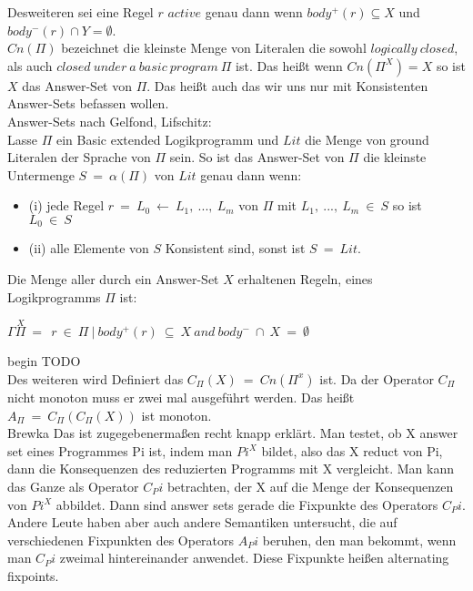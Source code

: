 Desweiteren sei eine Regel $r$ $active$ genau dann wenn $body^+(r) \subseteq X$ und $body^-(r) \cap Y = \emptyset$.\\

$Cn(\Pi)$ bezeichnet die kleinste Menge von Literalen die sowohl $logically~closed$, als auch $closed~under~a~basic~program~\Pi$ ist. Das heißt wenn $Cn(\Pi^X)=X$ so ist $X$ das Answer-Set von $\Pi$. Das heißt auch das wir uns nur mit Konsistenten Answer-Sets befassen wollen.\\

Answer-Sets nach Gelfond, Lifschitz:\\

Lasse $\Pi$ ein Basic extended Logikprogramm und $Lit$ die Menge von ground Literalen der Sprache von $\Pi$ sein. So ist das Answer-Set von $\Pi$ die kleinste Untermenge $S~=~\alpha(\Pi)$ von $Lit$ genau dann wenn:

\begin{itemize}
	\item (i) jede Regel $r~=~L_0~\leftarrow~L_1 ,~...,~L_m$ von $\Pi$ mit $L_1 ,~...,~L_m~\in~S$ so ist $L_0~\in~S$
	\item (ii) alle Elemente von $S$ Konsistent sind, sonst ist $S~=~Lit$.
\end{itemize}

Die Menge aller durch ein Answer-Set $X$ erhaltenen Regeln, eines Logikprogramms $\Pi$ ist:

\begin{center}
  $\Gamma\stackrel{X}{\Pi}~=~{~r~\in~\Pi~|~body^+(r)~\subseteq~X~and~body^-~\cap~X~=~\emptyset~}~$\\
\end{center}


begin TODO \\

Des weiteren wird Definiert das $C_\Pi(X)~=~Cn(\Pi^x)$ ist. Da der Operator $C_\Pi$ nicht monoton muss er zwei mal ausgeführt werden. Das heißt $A_\Pi~=~C_\Pi(C_\Pi(X))$ ist monoton.
\\

Brewka
Das ist zugegebenermaßen recht knapp erklärt. Man testet, ob X answer 
set eines Programmes Pi ist, indem man $Pi^X$ bildet, also das X reduct 
von Pi, dann die Konsequenzen des reduzierten Programms mit X 
vergleicht. Man kann das Ganze als Operator $C_Pi$ betrachten, der X auf 
die Menge der Konsequenzen von $Pi^X$ abbildet. Dann sind answer sets 
gerade die Fixpunkte des Operators $C_Pi$. Andere Leute haben aber auch 
andere Semantiken untersucht, die auf verschiedenen Fixpunkten des 
Operators $A_Pi$ beruhen, den man bekommt, wenn man $C_Pi$ zweimal 
hintereinander anwendet. Diese Fixpunkte heißen alternating fixpoints.
\\


